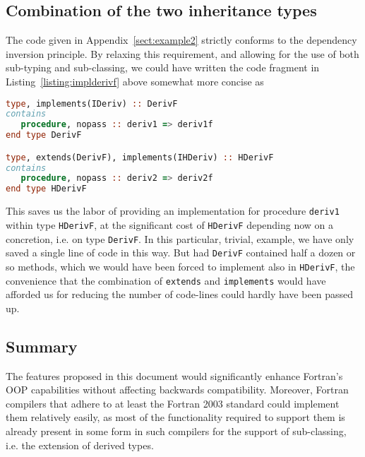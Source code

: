 \documentclass[11pt,oneside]{article}
\begin{document}
\subsection{Combination of the two inheritance types}

The code given in Appendix~\ref{sect:example2} strictly conforms to
the dependency inversion principle. By relaxing this requirement, and
allowing for the use of both sub-typing and sub-classing, we could
have written the code fragment in Listing~\ref{listing:implderivf}
above somewhat more concise as
\begin{lstlisting}[language=Fortran]
type, implements(IDeriv) :: DerivF
contains
   procedure, nopass :: deriv1 => deriv1f
end type DerivF

type, extends(DerivF), implements(IHDeriv) :: HDerivF
contains
   procedure, nopass :: deriv2 => deriv2f
end type HDerivF
\end{lstlisting}
This saves us the labor of providing an implementation for procedure
\texttt{deriv1} within type \texttt{HDerivF}, at the significant cost
of \texttt{HDerivF} depending now on a concretion, i.e. on type
\texttt{DerivF}. In this particular, trivial, example, we have only
saved a single line of code in this way. But had \texttt{DerivF}
contained half a dozen or so methods, which we would have been forced
to implement also in \texttt{HDerivF}, the convenience that the
combination of \texttt{extends} and \texttt{implements} would have
afforded us for reducing the number of code-lines could hardly have
been passed up.

\subsection{Summary}

The features proposed in this document would significantly enhance
Fortran's OOP capabilities without affecting backwards compatibility.
Moreover, Fortran compilers that adhere to at least the Fortran 2003
standard could implement them relatively easily, as most of the
functionality required to support them is already present in some form
in such compilers for the support of sub-classing, i.e. the extension
of derived types.





\end{document}
